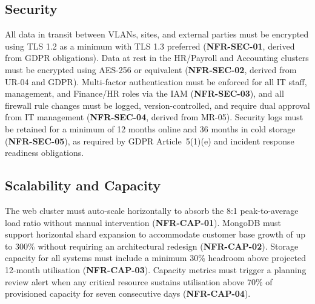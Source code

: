 \subsection{Security}

All data in transit between VLANs, sites, and external parties must be encrypted using TLS 1.2 as a minimum with TLS 1.3 preferred (\textbf{NFR-SEC-01}, derived from GDPR obligations). Data at rest in the HR/Payroll and Accounting clusters must be encrypted using AES-256 or equivalent (\textbf{NFR-SEC-02}, derived from UR-04 and GDPR). Multi-factor authentication must be enforced for all IT staff, management, and Finance/HR roles via the IAM (\textbf{NFR-SEC-03}), and all firewall rule changes must be logged, version-controlled, and require dual approval from IT management (\textbf{NFR-SEC-04}, derived from MR-05). Security logs must be retained for a minimum of 12 months online and 36 months in cold storage (\textbf{NFR-SEC-05}), as required by GDPR Article~5(1)(e) and incident response readiness obligations.

\subsection{Scalability and Capacity}

The web cluster must auto-scale horizontally to absorb the 8:1 peak-to-average load ratio without manual intervention (\textbf{NFR-CAP-01}). MongoDB must support horizontal shard expansion to accommodate customer base growth of up to 300\% without requiring an architectural redesign (\textbf{NFR-CAP-02}). Storage capacity for all systems must include a minimum 30\% headroom above projected 12-month utilisation (\textbf{NFR-CAP-03}). Capacity metrics must trigger a planning review alert when any critical resource sustains utilisation above 70\% of provisioned capacity for seven consecutive days (\textbf{NFR-CAP-04}).

